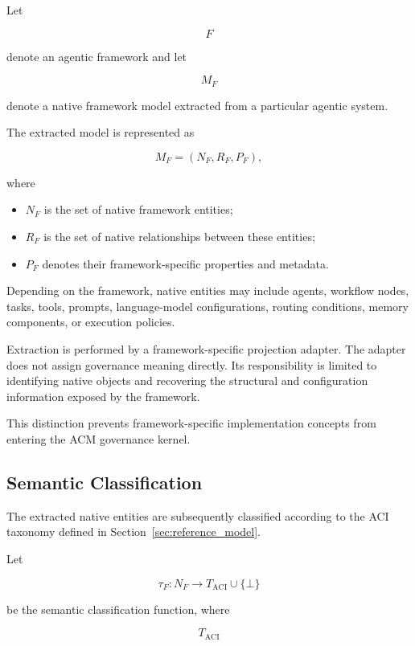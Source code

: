 \documentclass[10pt]{article}
\begin{document}
Let

\[
F
\]

denote an agentic framework and let

\[
M_F
\]

denote a native framework model extracted from a particular agentic system.

The extracted model is represented as

\begin{equation}
M_F=(N_F,R_F,P_F),
\label{eq:M_equality}
\end{equation}

where

\begin{itemize}
	\item $N_F$ is the set of native framework entities;
	\item $R_F$ is the set of native relationships between these entities;
	\item $P_F$ denotes their framework-specific properties and metadata.
\end{itemize}

Depending on the framework, native entities may include agents, workflow nodes, tasks, tools, prompts, language-model configurations, routing conditions, memory components, or execution policies.

Extraction is performed by a framework-specific projection adapter. The adapter does not assign governance meaning directly. Its responsibility is limited to identifying native objects and recovering the structural and configuration information exposed by the framework.

This distinction prevents framework-specific implementation concepts from entering the ACM governance kernel.

\subsection{Semantic Classification}

The extracted native entities are subsequently classified according to the ACI taxonomy defined in Section~\ref{sec:reference_model}.

Let

\[
\tau_F :
N_F
\rightarrow
T_{\mathrm{ACI}}
\cup
\{\bot\}
\]

be the semantic classification function, where

\[
T_{\mathrm{ACI}}
\]
\end{document}
